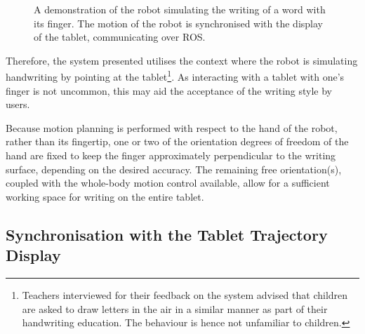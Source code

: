 \documentclass{sig-alternate}
\begin{document}
\begin{figure}[thpb]
     \begin{center}
%
    \end{center}
    \caption{A demonstration of the robot simulating the writing of a word with
    its finger. The motion of the robot is synchronised with the display of the
    tablet, communicating over ROS.\protect\footnotemark}%

   \label{fig:naoWriting}
\end{figure}

Therefore, the system presented utilises the context where the robot is
simulating handwriting by pointing at the tablet\footnote{Teachers interviewed
for their feedback on the system advised that children are asked to draw letters
in the air in a similar manner as part of their handwriting education. The behaviour 
is hence not unfamiliar to children.}. As
interacting with a tablet with one's finger is not uncommon, this may aid the
acceptance of the writing style by users. 

Because
motion planning is performed with respect to the hand of the robot, rather than
its fingertip, one or two of the orientation degrees of freedom of the hand
are fixed to keep the finger approximately perpendicular to the writing surface,
depending on the desired accuracy. The remaining free orientation(s), coupled
with the whole-body motion control available, allow for a sufficient working
space for writing on the entire tablet.

\subsection{Synchronisation with the Tablet Trajectory Display}\label{sec:tabletSynch}
\end{document}
